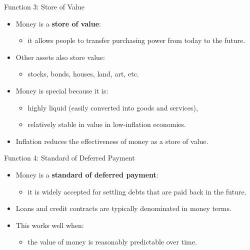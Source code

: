 \documentclass[aspectratio=169]{beamer}
\begin{document}
\begin{frame}{Function 3: Store of Value}
\transfade
\begin{itemize}[<+->]
  \item Money is a \textbf{store of value}:
  \begin{itemize}[<+->]
    \item it allows people to transfer purchasing power from today to the future.
  \end{itemize}
  \item Other assets also store value:
  \begin{itemize}[<+->]
    \item stocks, bonds, houses, land, art, etc.
  \end{itemize}
  \item Money is special because it is:
  \begin{itemize}[<+->]
    \item highly \alert{liquid} (easily converted into goods and services),
    \item relatively stable in value in low-inflation economies.
  \end{itemize}
  \item Inflation reduces the effectiveness of money as a store of value.
\end{itemize}
\end{frame}

\begin{frame}{Function 4: Standard of Deferred Payment}
\transfade
\begin{itemize}[<+->]
  \item Money is a \textbf{standard of deferred payment}:
  \begin{itemize}[<+->]
    \item it is widely accepted for settling debts that are paid back in the future.
  \end{itemize}
  \item Loans and credit contracts are typically denominated in money terms.
  \item This works well when:
  \begin{itemize}[<+->]
    \item the value of money is reasonably \alert{predictable} over time.
  \end{itemize}
\end{itemize}
\end{frame}
\end{document}
